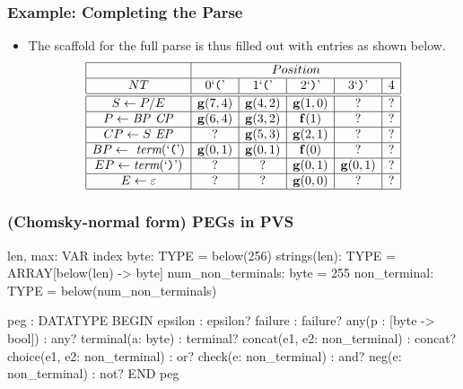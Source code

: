 \documentclass[xcolor=dvipsnames]{beamer}
\begin{document}
\begin{frame}[fragile]
\frametitle{Example: Completing the Parse}
\begin{itemize}
\item The scaffold for the full parse is thus filled out with entries as shown below. 
$$
\begin{array}[c]{|c|c|c|c|c|c|}\hline
  & \multicolumn{5}{c|}{Position} \\\hline
NT  & 0 \mbox{\lq\texttt{(}\rq}& 1 \mbox{\lq\texttt{(}\rq}& 2 \mbox{\lq\texttt{)}\rq}& 3 \mbox{\lq\texttt{)}\rq} & 4 \\\hline\hline
S \leftarrow  P / E &  \mathbf{g}(7, 4) & \mathbf{g}(4, 2) & \mathbf{g}(1, 0) & ? & ? \\\hline
  P \leftarrow  \mathit{BP}~\mathit{CP}  &  \mathbf{g}(6, 4) & \mathbf{g}(3, 2) & \mathbf{f}(1) & ? & ? \\\hline
  CP \leftarrow  S~\mathit{EP} &  ? & \mathbf{g}(5, 3) & \mathbf{g}(2, 1) & ? & ? \\\hline
  BP \leftarrow \textit{ term}(\mbox{\lq\texttt{(}\rq}) &  \mathbf{g}(0, 1) & \mathbf{g}(0, 1) & \mathbf{f}(0) & ? & ? \\\hline
  EP \leftarrow  \textit{term}(\mbox{\lq\texttt{)}\rq}) &  ? & ? & \mathbf{g}(0, 1) & \mathbf{g}(0, 1) & ? \\\hline
  E  \leftarrow  \varepsilon   & ? & ? & \mathbf{g}(0, 0) & ? & ? \\\hline
\end{array}
$$
\end{itemize}
\end{frame}


\begin{frame}[fragile]
\frametitle{(Chomsky-normal form) PEGs in PVS}
  \begin{smallersession}
len, max: VAR index %
byte: TYPE = below(256)
strings(len): TYPE = ARRAY[below(len) -> byte]
num_non_terminals: byte = 255
non_terminal: TYPE = below(num_non_terminals)

peg  : DATATYPE
  BEGIN
   epsilon : epsilon?
   failure : failure?
   any(p : [byte -> bool]) : any?
   terminal(a: byte) : terminal?
   concat(e1, e2: non_terminal) : concat?
   choice(e1, e2: non_terminal) : or?
   check(e: non_terminal) : and?
   neg(e: non_terminal) : not?
  END peg
\end{smallersession}

\end{frame}
\end{document}
